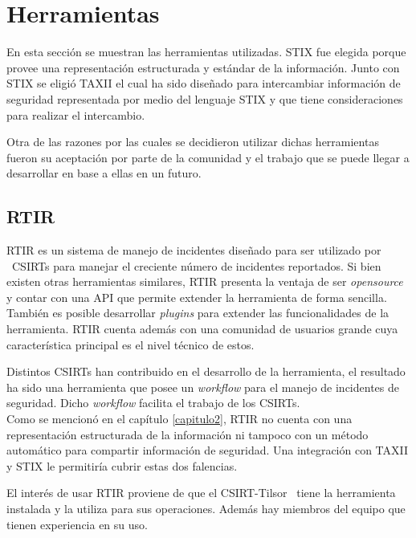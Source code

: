 \bigskip

\section{Herramientas}
	En esta sección se muestran las herramientas utilizadas. STIX fue elegida porque provee una representación estructurada
	y estándar de la información. Junto con STIX se eligió TAXII el cual ha sido diseñado para intercambiar información de
	seguridad representada por medio del lenguaje STIX y que tiene consideraciones para realizar el intercambio.\\
	\bigskip

	Otra de las razones por las cuales se decidieron utilizar dichas herramientas fueron su aceptación por parte de la comunidad y el trabajo que se puede llegar a desarrollar en base a ellas en un futuro.


\bigskip

\subsection{RTIR}

\bigskip

	RTIR es un sistema de manejo de incidentes diseñado para ser utilizado por \ CSIRTs para manejar el creciente número de
	incidentes reportados. Si bien existen otras herramientas similares, RTIR presenta la ventaja de ser
	\textit{opensource} y contar con una API que permite extender la herramienta de forma sencilla. También es posible
	desarrollar \textit{plugins} para extender las funcionalidades de la herramienta. RTIR cuenta además con una comunidad
	de usuarios grande cuya característica principal es el nivel técnico de estos.\\
	\bigskip

	Distintos CSIRTs han contribuido en el desarrollo de la herramienta, el resultado ha sido una herramienta que posee un
	\textit{workflow} para el manejo de incidentes de seguridad. Dicho \textit{workflow} facilita el trabajo de los
	CSIRTs.\\
\bigskip
	Como se mencionó en el capítulo \ref{capitulo2}, RTIR no cuenta con una representación estructurada de la información ni tampoco
	con un método automático para compartir información de seguridad. Una integración con TAXII y STIX le permitiría cubrir
	estas dos falencias.


\bigskip

	El interés de usar RTIR proviene de que el CSIRT-Tilsor \ tiene la herramienta instalada y la utiliza para sus
	operaciones. Además hay miembros del equipo que tienen experiencia en su uso.


